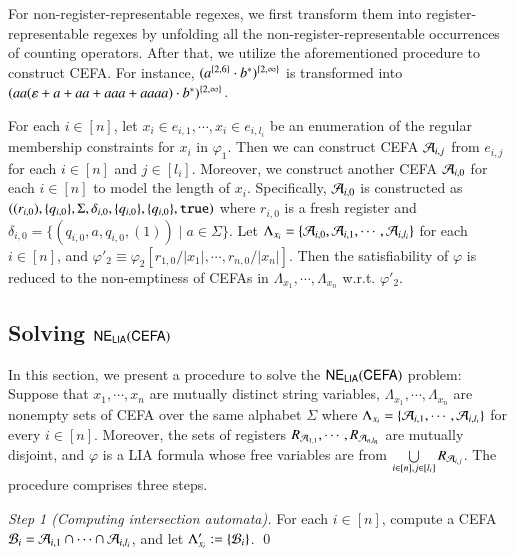 For non-register-representable regexes, we first transform them into register-representable regexes by unfolding all the non-register-representable occurrences of counting operators. After that, we utilize the aforementioned procedure to construct CEFA. For instance, $(a^{\{2, 6\}} \cdot b^*)^{\{2,\infty\}}$ is transformed into $(aa(\varepsilon + a + aa + aaa+aaaa) \cdot b^*)^{\{2, \infty\}}$. 

For each $i \in [n]$, let $x_i \in e_{i, 1}, \cdots, x_i \in e_{i, l_i}$ be an enumeration of the regular membership constraints for $x_i$ in $\varphi_1$.  Then we can construct CEFA $\mathcal{A}_{i, j}$ from $e_{i, j}$ for each $i \in [n]$ and $j \in [l_i]$. Moreover, we construct another CEFA $\mathcal{A}_{i, 0}$ for each $i \in [n]$ to model the length of $x_i$. Specifically, $\mathcal{A}_{i,0}$ is constructed as $((r_{i,0}), \{q_{i,0}\}, \Sigma, \delta_{i,0}, \{q_{i,0}\}, \{q_{i,0}\}, \mathtt{true})$ where $r_{i,0}$ is a fresh register and $\delta_{i,0} = \{(q_{i,0}, a, q_{i,0}, (1)) \mid a \in \Sigma\}$. 
Let $\Lambda_{x_i} = \{\mathcal{A}_{i,0}, \mathcal{A}_{i, 1}, \cdots, \mathcal{A}_{i, l_i}\}$ for each $i \in [n]$, and $\varphi'_2 \equiv \varphi_2[r_{1,0}/|x_1|, \cdots, r_{n,0}/|x_n|]$. Then the satisfiability of $\varphi$ is reduced to the non-emptiness of CEFAs in $\Lambda_{x_1}, \cdots, \Lambda_{x_n}$ w.r.t. $\varphi'_2$.


\subsection{Solving ${\sf NE_{LIA}(CEFA)}$} \label{subsec:cefadec}

In this section, we present a procedure to solve the ${\sf NE_{LIA}(CEFA)}$ problem: Suppose that $x_1, \cdots, x_n$ are mutually distinct string variables, $\Lambda_{x_1}, \cdots, \Lambda_{x_n}$ are nonempty sets of CEFA over the same alphabet $\Sigma$ where $\Lambda_{x_i} = \{\mathcal{A}_{i, 1}, \cdots, \mathcal{A}_{i, l_i}\}$ for every $i \in [n]$. Moreover, the sets of registers $R_{\mathcal{A}_{1, 1}}, \cdots, R_{\mathcal{A}_{n, l_n}}$ are mutually disjoint, and $\varphi$ is a LIA formula whose free variables are from $\bigcup \limits_{i \in [n], j \in [l_i]} R_{\mathcal{A}_{i, j}}$. 
The procedure comprises three steps. 

\medskip
\noindent
\emph{Step 1 (Computing intersection automata).} For each $i \in [n]$, compute a CEFA $\mathcal{B}_{i} = \mathcal{A}_{i,1} \cap \cdots \cap \mathcal{A}_{i, l_i}$, and let $\Lambda'_{x_i} := \{\mathcal{B}_i\}$. \qed

